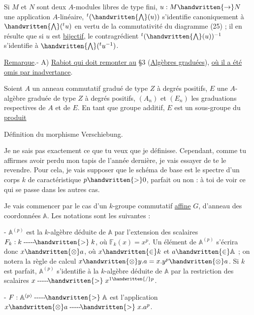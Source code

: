 Si $M$ et $N$ sont deux $A$-modules libres de type fini, $u:M\handwritten{\to}N$ une application $A$-linéaire, ${}^{t}(\handwritten{\bigwedge}(u))$ s'identifie canoniquement à $\handwritten{\bigwedge}({}^{t}u)$ en vertu de la commutativité du diagramme (25) ; il en résulte que si $u$ est \uline{bijectif}, le contragrédient ${}^{t}(\handwritten{\bigwedge}(u))^{-1}$ s'identifie à $\handwritten{\bigwedge}({}^{t}u^{-1})$.

\uline{Remarque}.- A) \uline{Rabiot qui doit remonter au} \S3 (\uline{Algèbres graduées}), \uline{où il a été omis par inadvertance}.

Soient $A$ un anneau commutatif gradué de type $Z$ à degrés positifs, $E$ une $A$-algèbre graduée de type $Z$ à degrés positifs, $(A_n)$ et $(E_n)$ les graduations respectives de $A$ et de $E$. En tant que groupe additif, $E$ est un sous-groupe du \uline{produit}


\begin{center}
Définition du morphisme Verschiebung.
\end{center}

Je ne sais pas exactement ce que tu veux que je définisse. Cependant, comme tu affirmes avoir perdu mon tapis de l'année dernière, je vais essayer de te le revendre. Pour cela, je vais supposer que le schéma de base est le spectre d'un corps $k$ de caractéristique $p\handwritten{>}0$, parfait ou non : à toi de voir ce qui se passe dans les autres cas.

Je vais commencer par le cas d'un $k$-groupe commutatif \uline{affine} $G$, d'anneau des coordonnées $\mathbb{A}$. Les notations sont les suivantes :

\noindent - $\mathbb{A}^{(p)}$ est la $k$-algèbre déduite de $\mathbb{A}$ par l'extension des scalaires $F_k:k\mathrel{\text{-{}-{}-{}-{}-}\!\handwritten{>}}k$, où $\mathbb{F}_k(x)=x^p$. Un élément de $\mathbb{A}^{(p)}$ s'écrira donc $x\handwritten{\otimes}a$, où $x\handwritten{\in}k$ et $a\handwritten{\in}\mathbb{A}$ ; on notera la règle de calcul $x\handwritten{\otimes}y.a=x.y^p\handwritten{\otimes}a$. Si $k$ est parfait, $\mathbb{A}^{(p)}$ s'identifie à la $k$-algèbre déduite de $\mathbb{A}$ par la restriction des scalaires $x\mathrel{\text{-{}-{}-{}-{}-}\!\handwritten{>}}x^{1\handwritten{/}p}$.

\noindent - $F:\mathbb{A}^{(p)}\mathrel{\text{-{}-{}-{}-{}-}\!\handwritten{>}}\mathbb{A}$ est l'application  $x\handwritten{\otimes}a\mathrel{\text{-{}-{}-{}-{}-}\!\handwritten{>}}x.a^p$.

